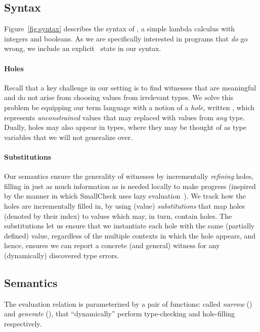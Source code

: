 \subsection{Syntax}
\label{sec:syntax}

%
Figure~\ref{fig:syntax} describes the syntax of \lang, a simple lambda
calculus with integers and booleans.
%
As we are specifically interested in programs that \emph{do} go wrong,
we include an explicit \stuck\ state in our syntax.

\paragraph{Holes}
\label{sec:holes}
%
Recall that a key challenge in our setting is to find witnesses
that are meaningful and do not arise from choosing values from
irrelevant types.
%
We solve this problem be equipping our term language with a notion
of a \emph{hole}, written \ehole{}, which represents \emph{unconstrained}
values that may replaced with values from \emph{any} type.
%
Dually, holes may also appear in types, where they may be thought
of as type variables that we will not generalize over.
%

\paragraph{Substitutions}
%
Our semantics ensure the generality of witnesses by incrementally
\emph{refining} holes, filling in just as much information as is
needed locally to make progress (inspired by the manner in
which SmallCheck uses lazy evaluation~\cite{runciman_smallcheck_2008}).
%
We track how the holes are incrementally filled in, by using
(value) \emph{substitutions} that map holes (denoted by their index)
to values which may, in turn, contain holes.
%
The substitutions let us ensure that we instantiate each hole
with the same (partially defined) value, regardless of the multiple
contexts in which the hole appears, and hence, ensures we can
report a concrete (and general) witness for any (dynamically)
discovered type errors.

\subsection{Semantics}
\label{sec:semantics}

%

The evaluation relation is parameterized by a pair of functions:
called \emph{narrow} (\forcesym) and \emph{generate} (\gensym),
that ``dynamically'' perform type-checking and hole-filling
respectively.


